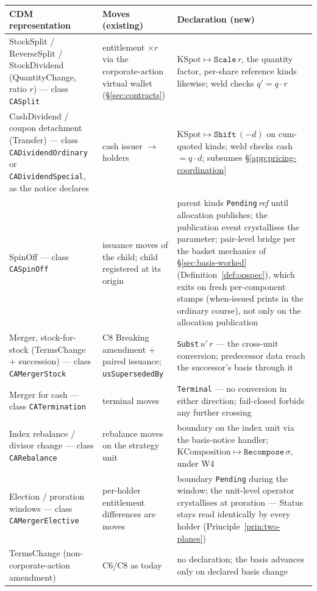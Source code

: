 \renewcommand{\arraystretch}{1.25}
\begin{center}
\begin{longtable}{@{}p{4.4cm} p{4.2cm} p{4.8cm}@{}}
\toprule
\textbf{CDM representation} & \textbf{Moves (existing)} & \textbf{Declaration (new)} \\
\midrule
\endhead
StockSplit / ReverseSplit / StockDividend (QuantityChange, ratio $r$) --- class
\texttt{CASplit} & entitlement
$\times r$ via the corporate-action virtual wallet (\S\ref{sec:contracts}) &
$\mathrm{KSpot}\mapsto\texttt{Scale}\,r$, the quantity factor, per-share reference
kinds likewise; weld checks $q'=q\cdot r$ \\
\addlinespace
CashDividend / coupon detachment (Transfer) --- class \texttt{CADividendOrdinary}
or \texttt{CADividendSpecial}, as the notice declares & cash issuer $\to$ holders &
$\mathrm{KSpot}\mapsto\texttt{Shift}\,(-d)$ on cum-quoted kinds; weld checks cash
$=q\cdot d$; subsumes \S\ref{app:pricing-coordination} \\
\addlinespace
SpinOff --- class \texttt{CASpinOff} & issuance moves of the child; child registered
at its origin & parent kinds
\texttt{Pending}\,\textit{ref} until allocation publishes; the publication event
crystallises the parameter; pair-level bridge per the basket mechanics of
\S\ref{sec:basis-worked} (Definition~\ref{def:opspec}), which exits on fresh
per-component stamps (when-issued prints in the ordinary course), not only on
the allocation publication \\
\addlinespace
Merger, stock-for-stock (TermsChange + succession) --- class \texttt{CAMergerStock}
& C8 Breaking amendment + paired
issuance; \texttt{usSupersededBy} & \texttt{Subst}\,$u'\,r$ --- the cross-unit conversion;
predecessor data reach the successor's basis through it \\
\addlinespace
Merger for cash --- class \texttt{CATermination} & terminal moves & \texttt{Terminal}
--- no conversion in either direction;
fail-closed forbids any further crossing \\
\addlinespace
Index rebalance / divisor change --- class \texttt{CARebalance} & rebalance moves on
the strategy unit & boundary on
the index unit via the basis-notice handler;
$\mathrm{KComposition}\mapsto\texttt{Recompose}\,\sigma$, under W4 \\
\addlinespace
Election / proration windows --- class \texttt{CAMergerElective} & per-holder
entitlement differences are moves & boundary
\texttt{Pending} during the window; the unit-level operator crystallises at proration
--- Status stays read identically by every holder
(Principle~\ref{prin:two-planes}) \\
\addlinespace
TermsChange (non-corporate-action amendment) & C6/C8 as today & no declaration; the
basis advances only on declared basis change \\
\bottomrule
\end{longtable}
\end{center}


